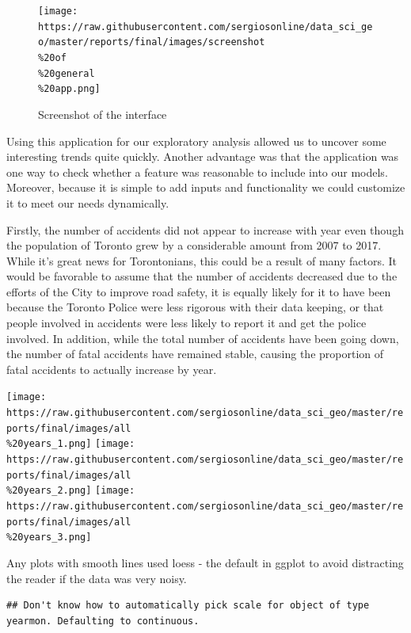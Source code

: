 \documentclass[]{article}
\begin{document}
\begin{figure}
\centering
\texttt{[image: https://raw.githubusercontent.com/sergiosonline/data\_sci\_geo/master/reports/final/images/screenshot\\\%20of\\\%20general\\\%20app.png]}
\caption{Screenshot of the interface}
\end{figure}

Using this application for our exploratory analysis allowed us to
uncover some interesting trends quite quickly. Another advantage was
that the application was one way to check whether a feature was
reasonable to include into our models. Moreover, because it is simple to
add inputs and functionality we could customize it to meet our needs
dynamically.

Firstly, the number of accidents did not appear to increase with year
even though the population of Toronto grew by a considerable amount from
2007 to 2017. While it's great news for Torontonians, this could be a
result of many factors. It would be favorable to assume that the number
of accidents decreased due to the efforts of the City to improve road
safety, it is equally likely for it to have been because the Toronto
Police were less rigorous with their data keeping, or that people
involved in accidents were less likely to report it and get the police
involved. In addition, while the total number of accidents have been
going down, the number of fatal accidents have remained stable, causing
the proportion of fatal accidents to actually increase by year.

\texttt{[image: https://raw.githubusercontent.com/sergiosonline/data\_sci\_geo/master/reports/final/images/all\\\%20years\_1.png]}
\texttt{[image: https://raw.githubusercontent.com/sergiosonline/data\_sci\_geo/master/reports/final/images/all\\\%20years\_2.png]}
\texttt{[image: https://raw.githubusercontent.com/sergiosonline/data\_sci\_geo/master/reports/final/images/all\\\%20years\_3.png]}

Any plots with smooth lines used loess - the default in ggplot to avoid
distracting the reader if the data was very noisy.

\begin{verbatim}
## Don't know how to automatically pick scale for object of type yearmon. Defaulting to continuous.
\end{verbatim}
\end{document}

